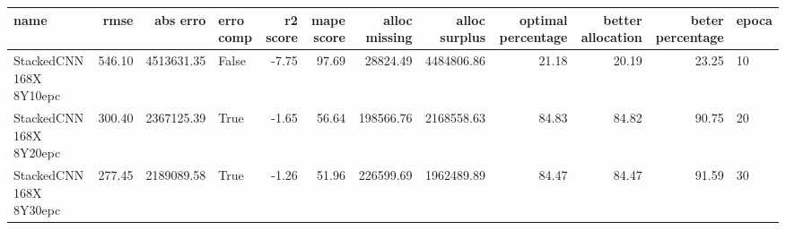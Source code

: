 \begin{tabular}{lrrlrrrrrrrl}
\toprule
name & rmse & abs erro & erro comp & r2 score & mape score & alloc missing & alloc surplus & optimal percentage & better allocation & beter percentage & epoca \\
\midrule
StackedCNN 168X 8Y10epc & 546.10 & 4513631.35 & False & -7.75 & 97.69 & 28824.49 & 4484806.86 & 21.18 & 20.19 & 23.25 & 10 \\
StackedCNN 168X 8Y20epc & 300.40 & 2367125.39 & True & -1.65 & 56.64 & 198566.76 & 2168558.63 & 84.83 & 84.82 & 90.75 & 20 \\
StackedCNN 168X 8Y30epc & 277.45 & 2189089.58 & True & -1.26 & 51.96 & 226599.69 & 1962489.89 & 84.47 & 84.47 & 91.59 & 30 \\
\bottomrule
\end{tabular}
